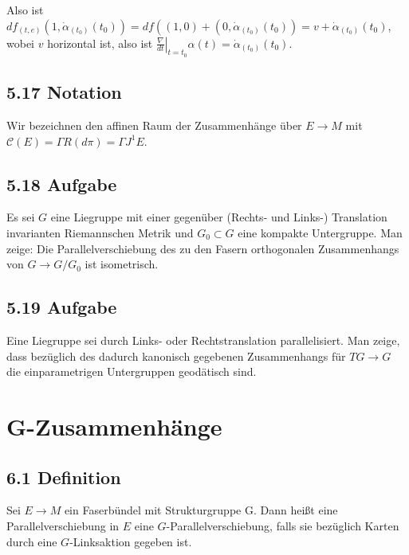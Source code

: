 Also ist $d f_{(t, e)}\left(1, \dot{\alpha}_{\left(t_{0}\right)}\left(t_{0}\right)\right)=d f\left((1,0)+\left(0, \dot{\alpha}_{\left(t_{0}\right)}\left(t_{0}\right)\right)=v+\dot{\alpha}_{\left(t_{0}\right)}\left(t_{0}\right)\right.$, wobei $v$ horizontal ist, also ist $\left.\frac{\nabla}{d t}\right|_{t=t_{0}} \alpha(t)=\dot{\alpha}_{\left(t_{0}\right)}\left(t_{0}\right)$.

\subsection*{5.17 Notation}
Wir bezeichnen den affinen Raum der Zusammenhänge über $E \rightarrow M$ mit $\mathcal{C}(E)=\Gamma R(d \pi)=\Gamma J^{1} E$.

\subsection*{5.18 Aufgabe}
Es sei $G$ eine Liegruppe mit einer gegenüber (Rechts- und Links-) Translation invarianten Riemannschen Metrik und $G_{0} \subset G$ eine kompakte Untergruppe. Man zeige: Die Parallelverschiebung des zu den Fasern orthogonalen Zusammenhangs von $G \rightarrow G / G_{0}$ ist isometrisch.

\subsection*{5.19 Aufgabe}
Eine Liegruppe sei durch Links- oder Rechtstranslation parallelisiert. Man zeige, dass bezüglich des dadurch kanonisch gegebenen Zusammenhangs für $T G \rightarrow G$ die einparametrigen Untergruppen geodätisch sind.



\pagebreak

\section{G-Zusammenhänge}

\subsection*{6.1 Definition}
Sei $E \rightarrow M$ ein Faserbündel mit Strukturgruppe G. Dann heißt eine Parallelverschiebung in $E$ eine $G$-Parallelverschiebung, falls sie bezüglich Karten durch eine $G$-Linksaktion gegeben ist.

